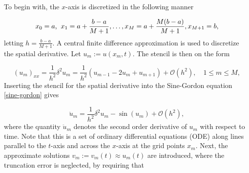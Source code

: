 To begin with, the $x$-axis is discretized in the following manner

\begin{equation*}
    x_0 = a \text{,} \hspace{2mm} x_1 = a+\frac{b-a}{M+1}, \ldots , x_M = a+\frac{M(b-a)}{M+1},  x_{M+1} = b,
\end{equation*}
letting $h = \frac{b-a}{M+1}$.
A central finite difference approximation is used to discretize the spatial derivative. Let $u_m := u(x_m, t)$. The stencil is then on the form 

\begin{equation*}
    (u_m)_{xx} = \frac{1}{h^2} \delta^2 u_m = \frac{1}{h^2}(u_{m-1} - 2u_m + u_{m+1}) + \mathcal{O}(h^2), \quad 1 \le m \le M, 
\end{equation*}
\noindent Inserting the stencil for the spatial derivative into the Sine-Gordon equation \eqref{sine-gordon} gives

\begin{equation*}
    \ddot{u}_m = \frac{1}{h^2}\delta^2u_m - \sin{(u_m)} + \mathcal{O}(h^2),
\end{equation*}
where the quantity $\ddot{u}_m$ denotes the second order derivative of $u_m$ with respect to time. Note that this is a set of ordinary differential equations (ODE) along lines parallel to the $t$-axis and across the $x$-axis at the grid points $x_m$. Next, the approximate solutions $v_m := v_m(t) \approx u_m(t)$ are introduced, where the truncation error is neglected, by requiring that 


